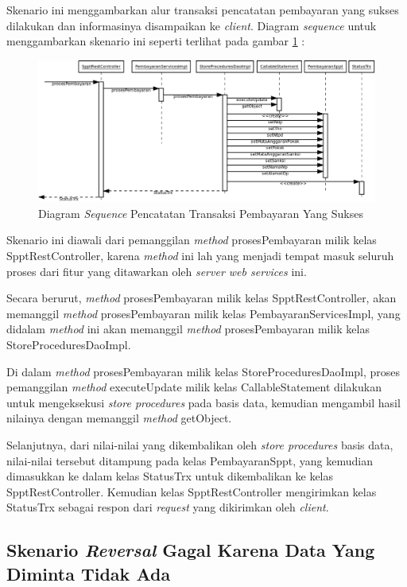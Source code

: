Skenario ini menggambarkan alur transaksi pencatatan pembayaran yang sukses dilakukan dan informasinya disampaikan ke \textit{client}. Diagram \textit{sequence} untuk menggambarkan skenario ini seperti terlihat pada gambar \ref{fig:uml-seq-trx} :

\begin{figure}[H]
  \centering
  \includegraphics[width=1\textwidth]{./resources/uml/uml-seq-trx}
  \caption{Diagram \textit{Sequence} Pencatatan Transaksi Pembayaran Yang Sukses}
  \label{fig:uml-seq-trx}
\end{figure}

Skenario ini diawali dari pemanggilan \textit{method} prosesPembayaran milik kelas SpptRestController, karena \textit{method} ini lah yang menjadi tempat masuk seluruh proses dari fitur yang ditawarkan oleh \textit{server web services} ini.

Secara berurut, \textit{method} prosesPembayaran milik kelas SpptRestController, akan memanggil \textit{method} prosesPembayaran milik kelas PembayaranServicesImpl, yang didalam \textit{method} ini akan memanggil \textit{method} prosesPembayaran milik kelas StoreProceduresDaoImpl.

Di dalam \textit{method} prosesPembayaran milik kelas StoreProceduresDaoImpl, proses pemanggilan \textit{method} executeUpdate milik kelas CallableStatement dilakukan untuk mengeksekusi \textit{store procedures} pada basis data, kemudian mengambil hasil nilainya dengan memanggil \textit{method} getObject.

Selanjutnya, dari nilai-nilai yang dikembalikan oleh \textit{store procedures} basis data, nilai-nilai tersebut ditampung pada kelas PembayaranSppt, yang kemudian dimasukkan ke dalam kelas StatusTrx untuk dikembalikan ke kelas SpptRestController. Kemudian kelas SpptRestController mengirimkan kelas StatusTrx sebagai respon dari \textit{request} yang dikirimkan oleh \textit{client}.

\subsection{Skenario \textit{Reversal} Gagal Karena Data Yang Diminta Tidak Ada}

